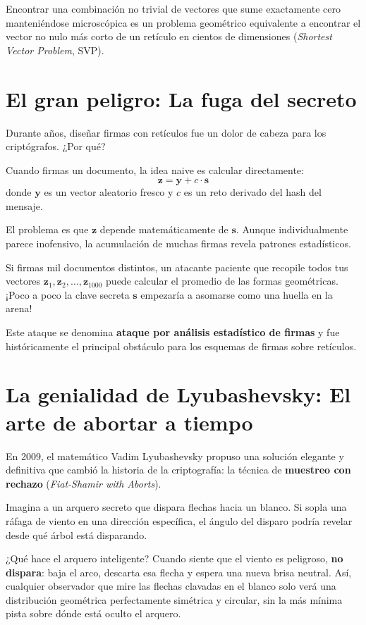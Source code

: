 Encontrar una combinación no trivial de vectores que sume exactamente cero manteniéndose microscópica es un problema geométrico equivalente a encontrar el vector no nulo más corto de un retículo en cientos de dimensiones (\textit{Shortest Vector Problem}, SVP).

\section{El gran peligro: La fuga del secreto}

Durante años, diseñar firmas con retículos fue un dolor de cabeza para los criptógrafos. ¿Por qué?

Cuando firmas un documento, la idea naive es calcular directamente:
\[
\mathbf{z} = \mathbf{y} + c \cdot \mathbf{s}
\]
donde $\mathbf{y}$ es un vector aleatorio fresco y $c$ es un reto derivado del hash del mensaje.

El problema es que $\mathbf{z}$ depende matemáticamente de $\mathbf{s}$. Aunque individualmente parece inofensivo, la acumulación de muchas firmas revela patrones estadísticos.

\begin{ojo}
Si firmas mil documentos distintos, un atacante paciente que recopile todos tus vectores $\mathbf{z}_1, \mathbf{z}_2, \dots, \mathbf{z}_{1000}$ puede calcular el promedio de las formas geométricas. ¡Poco a poco la clave secreta $\mathbf{s}$ empezaría a asomarse como una huella en la arena!

Este ataque se denomina \textbf{ataque por análisis estadístico de firmas} y fue históricamente el principal obstáculo para los esquemas de firmas sobre retículos.
\end{ojo}

\section{La genialidad de Lyubashevsky: El arte de abortar a tiempo}

En 2009, el matemático Vadim Lyubashevsky propuso una solución elegante y definitiva que cambió la historia de la criptografía: la técnica de \textbf{muestreo con rechazo} (\textit{Fiat-Shamir with Aborts}).

\begin{metafora}
Imagina a un arquero secreto que dispara flechas hacia un blanco. Si sopla una ráfaga de viento en una dirección específica, el ángulo del disparo podría revelar desde qué árbol está disparando.

¿Qué hace el arquero inteligente? Cuando siente que el viento es peligroso, \textbf{no dispara}: baja el arco, descarta esa flecha y espera una nueva brisa neutral. Así, cualquier observador que mire las flechas clavadas en el blanco solo verá una distribución geométrica perfectamente simétrica y circular, sin la más mínima pista sobre dónde está oculto el arquero.
\end{metafora}

